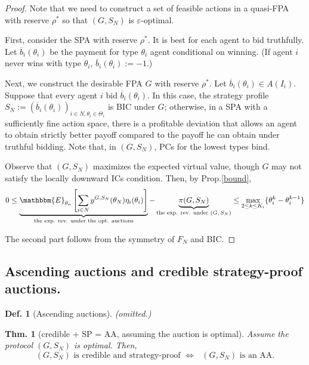 \documentclass[11pt,a4paper,dvipdfmx]{article}
\theoremstyle{plain}
\newtheorem{thm}{Thm.}[section]
\newtheorem{df}{Def.}[section]
\renewcommand{\bar}{\overline}
\renewcommand{\epsilon}{\varepsilon}
\newcommand{\equi}{\Longleftrightarrow}
\newcommand{\E}{\mathbbm{E}}
\newcommand{\1}{\mathbbm{1}}
\begin{document}
\begin{proof}
	Note that we need to construct a set of feasible actions in a quasi-FPA with reserve $\rho^*$ so that $(G, S_N)$ is $\epsilon$-optimal.
	
	First, consider the SPA with reserve $\rho^*$. It is best for each agent to bid truthfully. Let $\bar{b}_i(\theta_i)$ be the payment for type $\theta_i$ agent conditional on winning. (If agent $i$ never wins with type $\theta_i$, $\bar{b}_i(\theta_i) := -1$.)
	
	Next, we construct the desirable FPA $G$ with reserve $\rho^*$. Let $\bar{b}_i(\theta_i) \in A(I_i)$. Suppose that every agent $i$ bid $\bar{b}_i(\theta_i)$. In this case, the strategy profile $S_N := (\bar{b}_i(\theta_i))_{i \in N, \theta_i \in \Theta_i}$ is BIC under $G$; otherwise, in a SPA with a sufficiently fine action space, there is a profitable deviation that allows an agent to obtain strictly better payoff compared to the payoff he can obtain under truthful bidding. Note that, in $(G, S_N)$, PCs for the lowest types bind.
	
	Observe that $(G, S_N)$ maximizes the expected virtual value, though $G$ may not satisfy the locally downward ICs condition. Then, by Prop.\ref{bound}, 
	\[
	0 \leq 
	\underbrace{\E_{\theta_n} \left[ \sum_{i \in N} y^{G, S_N}(\theta_N) \eta_i(\theta_i) \right]}_{\text{the exp. rev. under the opt. auctions}}
	- \underbrace{\pi(G, S_N)}_{\text{the exp. rev. under $(G, S_N)$}}
	\leq \max_{2 \leq k \leq K_i} \{\theta_i^{k} - \theta_i^{k-1}\}
	\]
	
	The second part follows from the symmetry of $F_N$ and BIC.
\end{proof}



\subsection{Ascending auctions and credible strategy-proof auctions.}
\begin{df}[Ascending auctions]
	(omitted.)
\end{df}
\begin{screen}
\begin{thm}[credible + SP = AA, assuming the auction is optimal]
	Assume the protocol $(G, S_N)$ is optimal. Then,
	\[
	\text{$(G, S_N)$ is credible and strategy-proof $\equi$ $(G, S_N)$ is an AA.}
	\]
\end{thm}
\end{screen}
\end{document}
